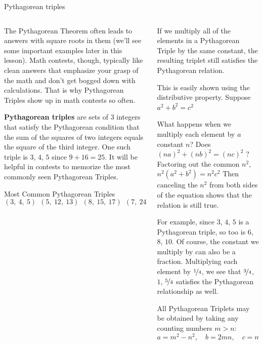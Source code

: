 \documentclass[9pt,aspectratio=169]{beamer}
\begin{document}
\begin{frame}{Pythagorean triples}
  \begin{columns}[T]
    \begin{column}{0.5\textwidth}
      The Pythagorean Theorem often leads to answers with square roots in them (we’ll see some important examples later in this lesson).  Math contests, though, typically like clean answers that emphasize your grasp of the math and don’t get bogged down with calculations.  That is why Pythagorean Triples show up in math contests so often.  
      
      \textbf{Pythagorean triples} are sets of $3$ integers that satisfy the Pythagorean condition that the sum of the squares of two integers equals the square of the third integer.  One such triple is $3$, $4$, $5$ since $9 + 16 = 25$.  It will be helpful in contests to memorize the most commonly seen Pythagorean Triples.

      \begin{definition}
        Most Common Pythagorean Triples
        \[ (3,\ 4,\ 5)\ \ (5,\ 12,\ 13)\ \ (8,\ 15,\ 17)\ \ (7,\ 24,\ 25)\]
        \vspace*{-\baselineskip}
      \end{definition}
    \end{column}
    \begin{column}{0.5\textwidth}
      \begin{problem}
        If we multiply all of the elements in a Pythagorean Triple by the same constant, the resulting triplet still satisfies the Pythagorean relation. 
      \end{problem}
      This is easily shown using the distributive property.  Suppose $a^2 + b^2 = c^2$
      
      What happens when we multiply each element by $a$ constant $n$?  Does $(na)^2 + (nb)^2 = (nc)^2$ ?  Factoring out the common $n^2$, $n^2 (a^2 + b^2) = n^2 c^2$  Then canceling the $n^2$ from both sides of the equation shows that the relation is still true.\smallskip

      For example, since $3$, $4$, $5$ is a Pythagorean triple, so too is $6$, $8$, $10$.  Of course, the constant we multiply by can also be a fraction.  Multiplying each element by $\nicefrac{1}{4}$, we see that $\nicefrac{3}{4}$, $1$, $\nicefrac{5}{4}$ satisfies the Pythagorean relationship as well.

      \begin{example}
        All Pythagorean Triplets may be obtained by taking any counting numbers $m > n$:
        \[ a = m^2 - n^2,\quad b = 2mn, \quad c = m^2 + n^2. \]
        \vspace*{-\baselineskip}
      \end{example}
    \end{column}
  \end{columns}
\end{frame}
\end{document}
